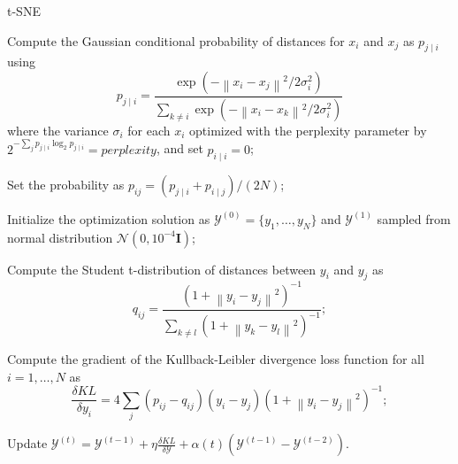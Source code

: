 \documentclass{article}
\begin{document}
\begin{algorithm}[!htb]
  \caption{t-SNE}
  \label{alg:tsne}
  \DontPrintSemicolon
  \SetAlgoLined
  \BlankLine
  \begin{algorithmic}[1]

  \STATE Compute the Gaussian conditional probability of distances for $x_i$ and $x_j$ as $p_{j \mid i}$ using
  $$
    p_{j \mid i}=\frac{\exp \left(-\left\|x_{i}-x_{j}\right\|^{2} / 2 \sigma_{i}^{2}\right)}{\sum_{k \neq i} \exp \left(-\left\|x_{i}-x_{k}\right\|^{2} / 2 \sigma_{i}^{2}\right)}
  $$
  where the variance $\sigma_{i}$ for each $x_i$ optimized with the perplexity parameter by $ 2 ^ {-\sum_j{p_{j \mid i} \log_2{p_{j \mid i}}}} = \textit{perplexity} $, and set $p_{i \mid i}=0$;

  \STATE Set the probability as $p_{i j}=(p_{j \mid i}+p_{i \mid j}) / (2 N)$;

  \STATE Initialize the optimization solution as $\mathcal{Y}^{(0)} = \{ y_1, \dots, y_N \}$ and $\mathcal{Y}^{(1)}$ sampled from normal distribution $\mathcal{N}(0, 10^{-4} \boldsymbol{I})$;


  \STATE Compute the Student t-distribution of distances between $y_i$ and $y_j$ as 
  $$
    q_{i j}=\frac{\left(1+\left\|y_{i}-y_{j}\right\|^{2}\right)^{-1}}{\sum_{k \neq l}\left(1+\left\|y_{k}-y_{l}\right\|^{2}\right)^{-1}};
  $$

  \STATE Compute the gradient of the Kullback-Leibler divergence loss function for all $i=1,\ldots,N$ as
  $$
    \frac{\delta KL}{\delta y_{i}}=4 \sum_{j}\left(p_{i j}-q_{i j}\right)\left(y_{i}-y_{j}\right)\left(1+\left\|y_{i}-y_{j}\right\|^{2}\right)^{-1} ;
  $$

  \STATE Update $ \mathcal{Y}^{(t)}=\mathcal{Y}^{(t-1)} + \eta \frac{\delta KL}{\delta \mathcal{Y}} + \alpha(t)\left(\mathcal{Y}^{(t-1)}-\mathcal{Y}^{(t-2)}\right). $

  \ENDFOR

  \end{algorithmic}
\end{algorithm}
\end{document}
